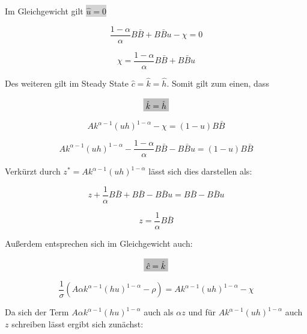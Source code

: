 Im Gleichgewicht gilt \colorbox{lightgray}{$\hat{u}=0$} 


	\begin{equation}
		\frac{1- \alpha}{\alpha} B \bar{B} + B \bar{B} u - \chi =0
	\end{equation}


	\begin{equation}
		\chi = \frac{1- \alpha}{\alpha} B \bar{B} + B \bar{B} u\label{ci1EL}
	\end{equation}


Des weiteren gilt im Steady State $\hat{c}=\hat{k}=\hat{h}$.
Somit gilt zum einen, dass


	\begin{equation}
		\colorbox{lightgray}{$\hat{k} = \hat{h}$}
	\end{equation}


	\begin{equation}
		Ak^{\alpha -1} (uh)^{1- \alpha} - \chi = (1- u) B\bar{B}
	\end{equation}


	\begin{equation}
		Ak^{\alpha -1} (uh)^{1- \alpha} - \frac{1- \alpha}{\alpha}B \bar{B} - B \bar{B}u  = (1- u) B\bar{B}
	\end{equation}


Verkürzt durch $z^*=Ak^{\alpha -1} (uh)^{1- \alpha}$ lässt sich dies darstellen als:


	\begin{equation}
		z + \frac{1}{\alpha}B \bar{B} + B\bar{B}- B \bar{B}u  =  B\bar{B} - B \bar{B} u
	\end{equation}


	\begin{equation}
		\boxed{z = \frac{1}{\alpha} B \bar{B}}\label{zEL}
	\end{equation}


Au{\ss}erdem entsprechen sich im Gleichgewicht auch: 


	\begin{equation}
		\colorbox{lightgray}{$\hat{c}= \hat{k}$}
	\end{equation}


	\begin{equation}
		\frac{1}{\sigma}(A\alpha k^{\alpha -1} (hu)^{1- \alpha}- \rho) = Ak^{\alpha -1} (uh)^{1- \alpha}- \chi
	\end{equation}


Da sich der Term $A\alpha k^{\alpha -1} (hu)^{1- \alpha}$ auch als $\alpha z$ und für $Ak^{\alpha -1} (uh)^{1- \alpha}$ auch $z$ schreiben lässt ergibt sich zunächst:


